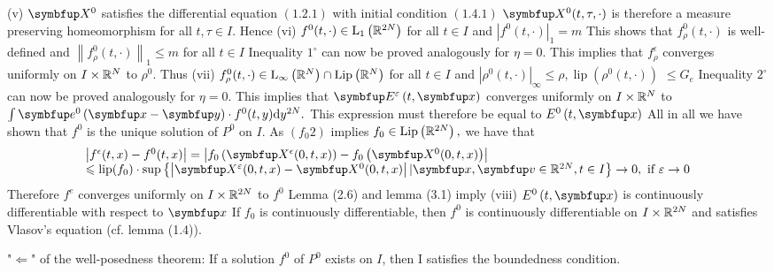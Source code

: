 \begin{lemma}
(v) $\vect{X}^{0}$ satisfies the differential equation $(1.2 .1)$ with initial condition $(1.4 .1)$ $\vect{X}^{0}(t, \tau, \cdot)$ is therefore a measure preserving homeomorphism for all $t, \tau \in I .$ Hence
(vi) $f^{0}(t, \cdot) \in \mathrm{L}_{1}\left({\mathbb{R}}^{2 N}\right)$ for all $t \in I$ and $\left|f^{0}(t, \cdot)\right|_{1}=m$
This shows that $f_{\rho}^{0}(t, \cdot)$ is well-defined and $\left\|f_{\rho}^{0}(t, \cdot)\right\|_{1} \leqslant m$ for all $t \in I$ Inequality $1^{\circ}$ can now be proved analogously for $\eta=0 .$ This implies that $f_{\rho}^{\epsilon}$ converges uniformly on $I \times {\mathbb{R}}^{N}$ to $\rho^{0} .$ Thus
(vii) $f_{\rho}^{0}(t, \cdot) \in \mathrm{L}_{\infty}\left({\mathbb{R}}^{N}\right) \cap \operatorname{Lip}\left({\mathbb{R}}^{N}\right)$ for all $t \in I$ and $\left|\rho^{0}(t, \cdot)\right|_{\infty} \leqslant \rho, \operatorname{lip}\left(\rho^{0}(t, \cdot)\right)$
$\leqslant G_{e}$
Inequality $2^{\circ}$ can now be proved analogously for $\eta=0 .$ This implies that $\vE^{\varepsilon}\left(t, \vx\right)$ converges uniformly on $I \times {\mathbb{R}}^{N}$ to $\int \vect{e}^{0}\left(\vx-\vect{y}\right) \cdot f^{0}(t, y) \mathrm{d} y^{2 N} .$ This
expression must therefore be equal to $E^{0}\left(t, \vx\right)$ All in all we have shown that $f^{0}$ is the unique solution of $P^{0}$ on $I$. As $(f_{0} 2)$ implies $f_{0} \in \operatorname{Lip}\left({\mathbb{R}}^{2 N}\right),$ we have that
\[
\begin{array}{l}
\left|f^{\epsilon}(t, x)-f^{0}(t, x)\right|=\left|f_{0}\left(\vect{X}^{\epsilon}(0, t, x)\right)-f_{0}\left(\vect{X}^{0}(0, t, x)\right)\right| \\
\leqslant \operatorname{lip}(f_{0}) \cdot \sup \left\{\left|\vect{X}^{\varepsilon}(0, t, x)-\vect{X}^{0}(0, t, x)\right| |\vx, \vv\in \bbR^{2 N}, t \in I\right\} \rightarrow 0, \text { if } \varepsilon \rightarrow 0
\end{array}
\]
Therefore $f^{e}$ converges uniformly on $I \times {\mathbb{R}}^{2 N}$ to $f^{0}$ Lemma (2.6) and lemma (3.1) imply (viii) $E^{0}\left(t, \vx\right)$ is continuously differentiable with respect to $\vx$ If $f_{0}$ is continuously differentiable, then $f^{0}$ is continuously differentiable on $I \times {\mathbb{R}}^{2 N}$ and satisfies Vlasov's equation (cf. lemma (1.4)). 


"$\Leftarrow$" of the well-posedness theorem: If a solution $f^{0}$ of $P^{0}$ exists on $I$, then I satisfies the boundedness condition. 


\end{lemma}
